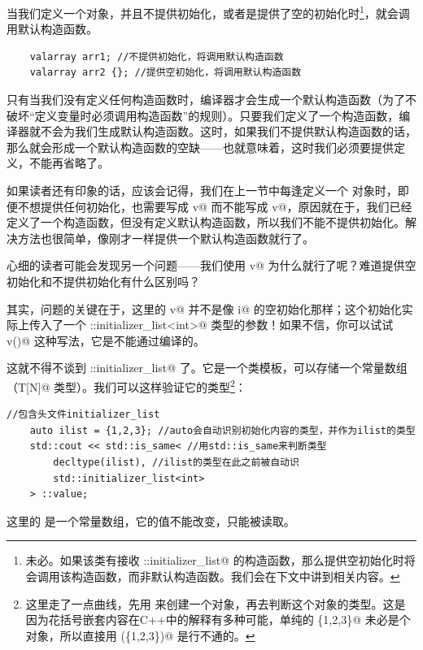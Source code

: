 当我们定义一个对象，并且不提供初始化，或者是提供了空的初始化时\footnote{未必。如果该类有接收 \lstinline@std::initializer_list@ 的构造函数，那么提供空初始化时将会调用该构造函数，而非默认构造函数。我们会在下文中讲到相关内容。}，就会调用默认构造函数。
\begin{lstlisting}
    valarray arr1; //不提供初始化，将调用默认构造函数
    valarray arr2 {}; //提供空初始化，将调用默认构造函数
\end{lstlisting}\par
只有当我们没有定义任何构造函数时，编译器才会生成一个默认构造函数（为了不破坏``定义变量时必须调用构造函数''的规则）。只要我们定义了一个构造函数，编译器就不会为我们生成默认构造函数。这时，如果我们不提供默认构造函数的话，那么就会形成一个默认构造函数的空缺——也就意味着，这时我们必须要提供定义，不能再省略了。\par
如果读者还有印象的话，应该会记得，我们在上一节中每逢定义一个 \lstinline@valarri@ 对象时，即便不想提供任何初始化，也需要写成 \lstinline@valarri v{}@ 而不能写成 \lstinline@valarri v@，原因就在于，我们已经定义了一个构造函数，但没有定义默认构造函数，所以我们不能不提供初始化。解决方法也很简单，像刚才一样提供一个默认构造函数就行了。\par
心细的读者可能会发现另一个问题——我们使用 \lstinline@valarri v{}@ 为什么就行了呢？难道提供空初始化和不提供初始化有什么区别吗？\par
其实，问题的关键在于，这里的 \lstinline@valarri v{}@ 并不是像 \lstinline@int i{}@ 的空初始化那样；这个初始化实际上传入了一个 \lstinline@std::initializer_list<int>@ 类型的参数！如果不信，你可以试试 \lstinline@valarri v()@ 这种写法，它是不能通过编译的。\par
这就不得不谈到 \lstinline@std::initializer_list@ 了。它是一个类模板，可以存储一个常量数组\\（\lstinline@const T[N]@ 类型）。我们可以这样验证它的类型\footnote{这里走了一点曲线，先用 \lstinline@auto@ 来创建一个对象，再去判断这个对象的类型。这是因为花括号嵌套内容在C++中的解释有多种可能，单纯的 \lstinline@\{1,2,3\}@ 未必是个对象，所以直接用 \lstinline@decltype(\{1,2,3\})@ 是行不通的。}：
\begin{lstlisting}
//包含头文件initializer_list
    auto ilist = {1,2,3}; //auto会自动识别初始化内容的类型，并作为ilist的类型
    std::cout << std::is_same< //用std::is_same来判断类型
        decltype(ilist), //ilist的类型在此之前被自动识
        std::initializer_list<int>
    > ::value;
\end{lstlisting}
这里的 \lstinline@ilist@ 是一个常量数组，它的值不能改变，只能被读取。\par
